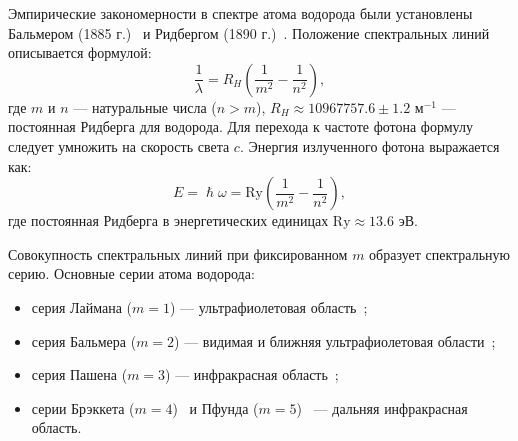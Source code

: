 \documentclass[a4paper, 12pt]{article}
\begin{document}
Эмпирические закономерности в спектре атома водорода были установлены Бальмером
(1885 г.)~\cite{Balmer1885} и Ридбергом (1890 г.)~\cite{Rydberg1890}. Положение спектральных линий описывается
формулой:
\begin{equation}
\frac{1}{\lambda} = R_H\left(\frac{1}{m^2} - \frac{1}{n^2}\right),
\end{equation}
где $m$ и $n$ --- натуральные числа ($n > m$),
$R_H \approx 10967757.6\pm1.2\text{ м}^{-1}$ --- постоянная Ридберга для водорода. Для
перехода к частоте фотона формулу следует умножить на скорость света $c$.
Энергия излученного фотона выражается как:
\begin{equation}
E = \hslash\omega = \text{Ry}\left(\frac{1}{m^2} - \frac{1}{n^2}\right),
\end{equation}
где постоянная Ридберга в энергетических единицах $\text{Ry} \approx 13.6\text{ эВ}$.

Совокупность спектральных линий при фиксированном $m$ образует спектральную
серию. Основные серии атома водорода:
\begin{itemize}
\item серия Лаймана ($m=1$) --- ультрафиолетовая область~\cite{Lyman1906};
\item серия Бальмера ($m=2$) --- видимая и ближняя ультрафиолетовая области~\cite{Balmer1885};
\item серия Пашена ($m=3$) --- инфракрасная область~\cite{Paschen1908};
\item серии Брэккета ($m=4$)~\cite{Brackett1922} и Пфунда ($m=5$)~\cite{Pfund1924} --- дальняя инфракрасная область.
\end{itemize}
\end{document}
